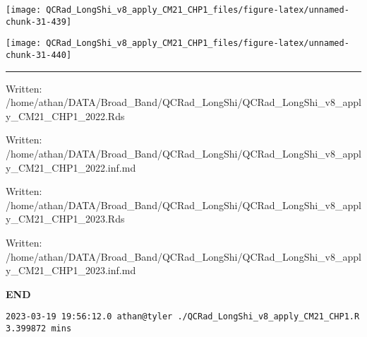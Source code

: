 \documentclass[
  10pt,
  a4paper,oneside]{article}
\begin{document}
\begin{center}\texttt{[image: QCRad\_LongShi\_v8\_apply\_CM21\_CHP1\_files/figure-latex/unnamed-chunk-31-439]} \end{center}

\begin{center}\texttt{[image: QCRad\_LongShi\_v8\_apply\_CM21\_CHP1\_files/figure-latex/unnamed-chunk-31-440]} \end{center}

\begin{center}\rule{0.5\linewidth}{0.5pt}\end{center}

Written: /home/athan/DATA/Broad\_Band/QCRad\_LongShi/QCRad\_LongShi\_v8\_apply\_CM21\_CHP1\_2022.Rds

Written: /home/athan/DATA/Broad\_Band/QCRad\_LongShi/QCRad\_LongShi\_v8\_apply\_CM21\_CHP1\_2022.inf.md

Written: /home/athan/DATA/Broad\_Band/QCRad\_LongShi/QCRad\_LongShi\_v8\_apply\_CM21\_CHP1\_2023.Rds

Written: /home/athan/DATA/Broad\_Band/QCRad\_LongShi/QCRad\_LongShi\_v8\_apply\_CM21\_CHP1\_2023.inf.md

\textbf{END}

\begin{verbatim}
2023-03-19 19:56:12.0 athan@tyler ./QCRad_LongShi_v8_apply_CM21_CHP1.R 3.399872 mins
\end{verbatim}
\end{document}
